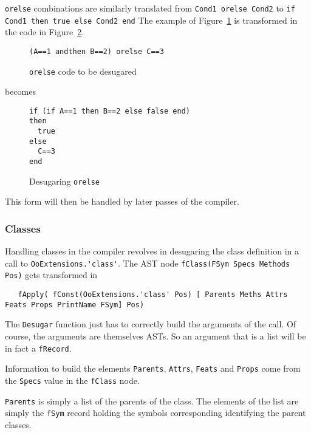 \documentclass[a4paper]{memoir}
\begin{document}
\lstinline!orelse! combinations are similarly translated from \lstinline!Cond1 orelse Cond2! to \lstinline!if Cond1 then true else Cond2 end!  
The example of Figure~\ref{fig:desugar:orelsesrc} is transformed in the code in
Figure~\ref{fig:desugar:orelse}.
\begin{figure}[h]
\begin{lstlisting}
(A==1 andthen B==2) orelse C==3
\end{lstlisting}
\caption{\lstinline!orelse! code to be desugared}
\label{fig:desugar:orelsesrc}
\end{figure}

becomes

\begin{figure}[h]
\begin{lstlisting}
if (if A==1 then B==2 else false end)
then
  true
else
  C==3
end
\end{lstlisting}
\caption{Desugaring \lstinline!orelse!}
\label{fig:desugar:orelse}
\end{figure}


This form will then be handled by later passes of the compiler.
\subsubsection{Classes}\label{sec:arch:desugar:classes}
Handling classes in the
compiler revolves in desugaring the class definition in a call to
\lstinline!OoExtensions.'class'!. 
The AST node \lstinline!fClass(FSym Specs Methods Pos)! gets transformed in 
\begin{lstlisting}
   fApply( fConst(OoExtensions.'class' Pos) [ Parents Meths Attrs Feats Props PrintName FSym] Pos)
\end{lstlisting}

The \lstinline!Desugar! function just has to correctly build the arguments of
the call. Of course, the arguments are themselves ASTs. So an argument that is a
list will be in fact a \lstinline!fRecord!.

Information to build the elements \lstinline!Parents!, \lstinline!Attrs!,
\lstinline!Feats! and \lstinline!Props! come from the \lstinline!Specs! value in
the \lstinline!fClass! node.

\lstinline!Parents! is simply a list of the parents of the class. The elements
of the list are simply the \lstinline!fSym! record holding the symbols
corresponding identifying the parent classes.
\end{document}
